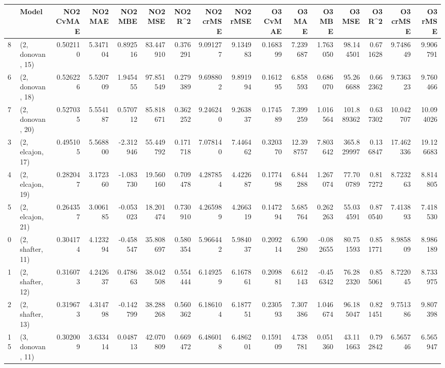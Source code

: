 \begin{tabular}{llrrrrrrrrrrrrrr}
\toprule
{} &             Model &  NO2 CvMAE &   NO2 MAE &   NO2 MBE &    NO2 MSE &   NO2 R\textasciicircum2 &  NO2 crMSE &  NO2 rMSE &  O3 CvMAE &     O3 MAE &    O3 MBE &      O3 MSE &    O3 R\textasciicircum2 &   O3 crMSE &    O3 rMSE \\
\midrule
8  &  (2, donovan, 15) &   0.502110 &  5.347104 &  0.892516 &  83.447910 &  0.376291 &   9.091277 &  9.134983 &  0.168399 &   7.239687 &  1.763050 &   98.144501 &  0.671628 &   9.748649 &   9.906791 \\
6  &  (2, donovan, 18) &   0.526226 &  5.520709 &  1.945455 &  97.851549 &  0.279389 &   9.698802 &  9.891994 &  0.161295 &   6.858593 &  0.686070 &   95.266688 &  0.662362 &   9.736323 &   9.760466 \\
7  &  (2, donovan, 20) &   0.527035 &  5.554187 &  0.570712 &  85.818671 &  0.362252 &   9.246240 &  9.263837 &  0.174589 &   7.399259 &  1.016564 &  101.889362 &  0.637302 &  10.042707 &  10.094026 \\
3  &  (2, elcajon, 17) &   0.495105 &  5.568800 & -2.312946 &  55.449792 &  0.171718 &   7.078140 &  7.446462 &  0.320370 &  12.398757 &  7.803642 &  365.829997 &  0.136847 &  17.462336 &  19.126683 \\
4  &  (2, elcajon, 19) &   0.282047 &  3.172360 & -1.083730 &  19.560160 &  0.709478 &   4.287854 &  4.422687 &  0.177498 &   6.844288 &  1.267074 &   77.700789 &  0.817272 &   8.723263 &   8.814805 \\
5  &  (2, elcajon, 21) &   0.264357 &  3.006185 & -0.053023 &  18.201474 &  0.730910 &   4.265989 &  4.266319 &  0.147294 &   5.685764 &  0.262263 &   55.034591 &  0.870540 &   7.413893 &   7.418530 \\
0  &  (2, shafter, 11) &   0.304174 &  4.123294 & -0.458547 &  35.808697 &  0.580354 &   5.966442 &  5.984037 &  0.209214 &   6.590280 & -0.082655 &   80.751593 &  0.851771 &   8.985809 &   8.986189 \\
1  &  (2, shafter, 12) &   0.316073 &  4.242637 &  0.478663 &  38.042508 &  0.554444 &   6.149259 &  6.167861 &  0.209881 &   6.612143 & -0.456342 &   76.282320 &  0.855061 &   8.722045 &   8.733975 \\
2  &  (2, shafter, 13) &   0.319673 &  4.314798 & -0.142799 &  38.288268 &  0.560362 &   6.186104 &  6.187751 &  0.230593 &   7.307386 &  1.046674 &   96.185047 &  0.821451 &   9.751386 &   9.807398 \\
15 &  (3, donovan, 11) &   0.302009 &  3.633414 &  0.048713 &  42.070809 &  0.669472 &   6.486018 &  6.486201 &  0.159109 &   4.738781 &  0.051360 &   43.111663 &  0.792842 &   6.565746 &   6.565947 \\

\end{tabular}
